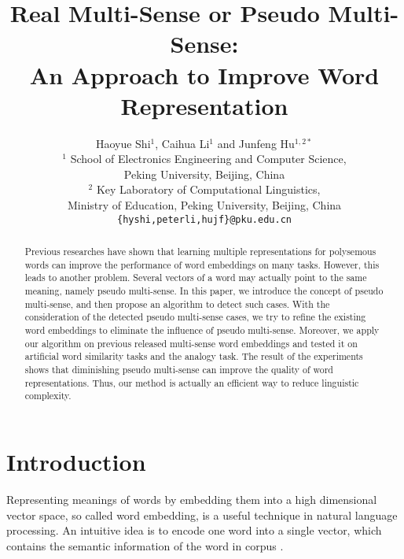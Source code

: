 \documentclass[11pt]{article}
\title{Real Multi-Sense or Pseudo Multi-Sense: \\An Approach to Improve Word Representation}
\author{Haoyue Shi$^1$, Caihua Li$^1$ and Junfeng Hu$^{1,2*}$ \\
$^1$ School of Electronics Engineering and Computer Science, \\ Peking University, Beijing, China \\
$^2$ Key Laboratory of Computational Linguistics,\\ Ministry of Education, Peking University, Beijing, China\\
{\tt \{hyshi,peterli,hujf\}@pku.edu.cn}}
\date{}
\begin{document}
\maketitle
\begin{abstract}
Previous researches have shown that learning multiple representations for polysemous words can improve the performance of word embeddings on many tasks. However, this leads to another problem. Several vectors of a word may actually point to the same meaning, namely pseudo multi-sense. In this paper, we introduce the concept of pseudo multi-sense, and then propose an algorithm to detect such cases. With the consideration of the detected pseudo multi-sense cases, we try to refine the existing word embeddings to eliminate the influence of pseudo multi-sense. Moreover, we apply our algorithm on previous released multi-sense word embeddings and tested it on artificial word similarity tasks and the analogy task. The result of the experiments shows that diminishing pseudo multi-sense can improve the quality of word representations. Thus, our method is actually an efficient way to reduce linguistic complexity. 
\end{abstract}

\section{Introduction}

\par
Representing meanings of words by embedding them into a high dimensional vector space, so called word embedding, is a useful technique in natural language processing. An intuitive idea is to encode one word into a single vector, which contains the semantic information of the word in corpus \cite{bengio2003neural, collobert2008unified, mnih2007three, mikolov2010recurrent}.
\end{document}
